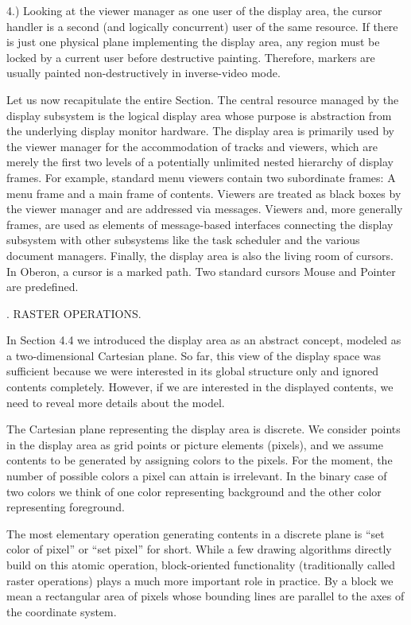 4.) Looking at the viewer manager as one user of the display area, the cursor handler is a second (and logically concurrent) user of the same resource. If there is just one physical plane implementing the display area, any region must be locked by a current user before destructive painting. Therefore, markers are usually painted non-destructively in inverse-video mode.

Let us now recapitulate the entire Section. The central resource
managed by the display subsystem is the logical display area whose
purpose is abstraction from the underlying display monitor
hardware. The display area is primarily used by the viewer manager for
the accommodation of tracks and viewers, which are merely the first
two levels of a potentially unlimited nested hierarchy of display
frames. For example, standard menu viewers contain two subordinate
frames: A menu frame and a main frame of contents. Viewers are treated
as black boxes by the viewer manager and are addressed via
messages. Viewers and, more generally frames, are used as elements of
message-based interfaces connecting the display subsystem with other
subsystems like the task scheduler and the various document
managers. Finally, the display area is also the living room of
cursors. In Oberon, a cursor is a marked path. Two standard cursors
Mouse and Pointer are predefined.

. RASTER OPERATIONS.

In Section 4.4 we introduced the display area as an abstract concept,
modeled as a two-dimensional Cartesian plane. So far, this view of
the display space was sufficient because we were interested in its
global structure only and ignored contents completely. However, if we
are interested in the displayed contents, we need to reveal more
details about the model.

The Cartesian plane representing the display area is discrete. We
consider points in the display area as grid points or picture elements
(pixels), and we assume contents to be generated by assigning colors
to the pixels. For the moment, the number of possible colors a pixel
can attain is irrelevant. In the binary case of two colors we think of
one color representing background and the other color representing
foreground.

The most elementary operation generating contents in a discrete plane
is ``set color of pixel'' or ``set pixel'' for short. While a few drawing
algorithms directly build on this atomic operation, block-oriented
functionality (traditionally called raster operations) plays a much
more important role in practice. By a block we mean a rectangular area
of pixels whose bounding lines are parallel to the axes of the
coordinate system.

